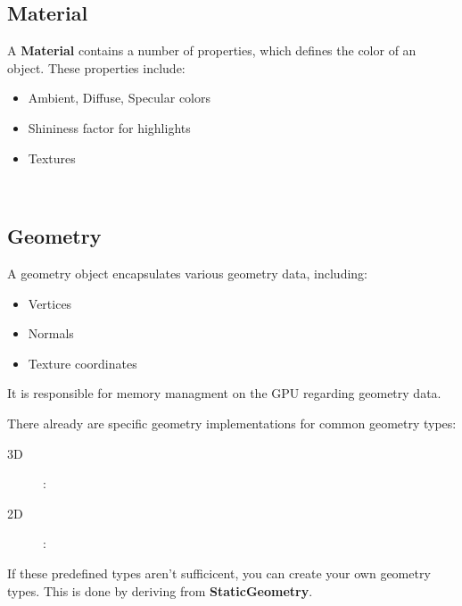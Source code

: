 \documentclass[12p, paper=a4, leqno, colorinlistoftodos]{article}
\newenvironment{packed_itemize}
{\begin{itemize}
		\setlength{\itemsep}{0pt}
		\setlength{\parskip}{0pt}
		\setlength{\parsep}{0pt}
	}{\end{itemize}}
\begin{document}
		\subsection{Material}
			A \textbf{Material} contains a number of properties, which defines the color of an object. These properties include:
			\begin{itemize}
				\item Ambient, Diffuse, Specular colors
				\item Shininess factor for highlights
				\item Textures
			\end{itemize}
			\begin{lstlisting}
				
			\end{lstlisting}	
		
		\subsection{Geometry}
			A geometry object encapsulates various geometry data, including:
			\begin{itemize}
				\item Vertices
				\item Normals
				\item Texture coordinates
			\end{itemize}
			It is responsible for memory managment on the GPU regarding geometry data.
			
			There already are specific geometry implementations for common geometry types:
			\begin{description}
				\item[3D]: 
				\item[2D]:
			\end{description}
			If these predefined types aren't sufficicent, you can create your own geometry types. This is done by deriving from \textbf{StaticGeometry}.
			
\end{document}
